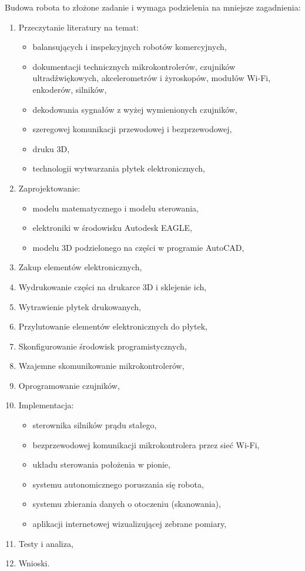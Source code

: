 \documentclass[a4paper,12pt,twoside,openany]{report}
\begin{document}
Budowa robota to złożone zadanie i wymaga podzielenia na mniejsze zagadnienia:
\begin{enumerate}
	\item Przeczytanie literatury na temat: 
    \begin{itemize}
    	\item balansujących i inspekcyjnych robotów komercyjnych, 
        \item dokumentacji technicznych mikrokontrolerów, czujników ultradźwiękowych, akcelerometrów i żyroskopów, modułów Wi-Fi, enkoderów, silników,
        \item dekodowania sygnałów z wyżej wymienionych czujników,
        \item szeregowej komunikacji przewodowej i bezprzewodowej,
        \item druku 3D,
        \item technologii wytwarzania płytek elektronicznych,
    \end{itemize}
	\item Zaprojektowanie:
    	\begin{itemize}
    		\item modelu matematycznego i modelu sterowania,
        	\item elektroniki w środowisku Autodesk EAGLE,
        	\item modelu 3D podzielonego na części w programie AutoCAD,
    	\end{itemize}
    \item Zakup elementów elektronicznych,
	\item Wydrukowanie części na drukarce 3D i sklejenie ich,
	\item Wytrawienie płytek drukowanych,
	\item Przylutowanie elementów elektronicznych do płytek,
	\item Skonfigurowanie środowisk programistycznych,
    \item Wzajemne skomunikowanie mikrokontrolerów,
    \item Oprogramowanie czujników,
    \item Implementacja:
    	\begin{itemize}
    		\item sterownika silników prądu stałego,
        	\item bezprzewodowej komunikacji mikrokontrolera przez sieć Wi-Fi,
        	\item układu sterowania położenia w pionie,
            \item systemu autonomicznego poruszania się robota,
            \item systemu zbierania danych o otoczeniu (skanowania),
            \item aplikacji internetowej wizualizującej zebrane pomiary,
    	\end{itemize}
    \item Testy i analiza,
    \item Wnioski.
\end{enumerate}
\end{document}
